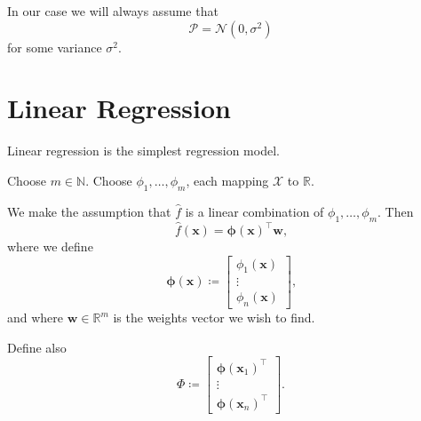 \documentclass[11pt]{report}
\newcommand\bw{\mathbf{w}}
\newcommand\bx{\mathbf{x}}
\newcommand\bphi{\bm{\phi}}
\newcommand\bbN{\mathbb{N}}
\newcommand\bbR{\mathbb{R}}
\newcommand\cN{\mathcal{N}}
\newcommand\cP{\mathcal{P}}
\newcommand\cX{\mathcal{X}}
\begin{document}
In our case we will always assume that \[
    \cP = \cN(0, \sigma^2)
\] for some variance $\sigma^2$.

\section{Linear Regression}

Linear regression is the simplest regression model.

Choose $m \in \bbN$. Choose $\phi_1, \dots, \phi_m$, each mapping $\cX$ to $\bbR$.

We make the assumption that $\hat f$ is a linear combination of $\phi_1, \dots, \phi_m$. Then \[
    \hat f(\bx) = \bphi(\bx)^\top \bw \text{,}
\] where we define \[
    \bphi(\bx) \coloneqq \begin{bmatrix} \phi_1(\bx) \\ \vdots \\ \phi_n(\bx) \end{bmatrix}\text{,}
\] and where $\bw \in \bbR^m$ is the weights vector we wish to find.

Define also\[
    \Phi \coloneqq \begin{bmatrix}
        \bphi(\bx_1)^\top \\
        \vdots \\
        \bphi(\bx_n)^\top
    \end{bmatrix} \text{.}
\]
\end{document}
